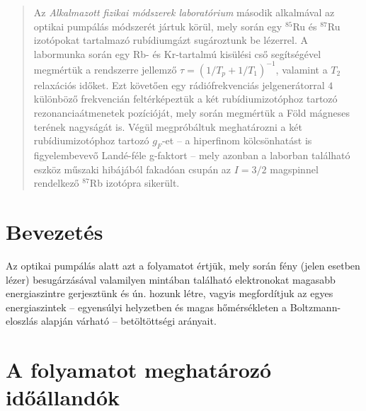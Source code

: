 \begin{abstract}
    \noindent Az \emph{Alkalmazott fizikai módszerek laboratórium} második alkalmával az optikai pumpálás módszerét jártuk körül, mely során egy $^{85}$Ru és $^{87}$Ru izotópokat tartalmazó rubídiumgázt sugároztunk be lézerrel. A labormunka során egy Rb- és Kr-tartalmú kisülési cső segítségével megmértük a rendszerre jellemző $\tau = \left( 1/T_{p} + 1/T_{1} \right)^{-1}$, valamint a $T_{2}$ relaxációs időket. Ezt követően egy rádiófrekvenciás jelgenerátorral $4$ különböző frekvencián feltérképeztük a két rubídiumizotóphoz tartozó rezonanciaátmenetek pozícióját, mely során megmértük a Föld mágneses terének nagyságát is. Végül megpróbáltuk meghatározni a két rubídiumizotóphoz tartozó $g_{F}$-et -- a hiperfinom kölcsönhatást is figyelembevevő Landé-féle g-faktort -- mely azonban a laborban található eszköz műszaki hibájából fakadóan csupán az $I=3/2$ magspinnel rendelkező $^{87}$Rb izotópra sikerült.
\end{abstract}

\begin{multicols}{2}
\section{Bevezetés}
Az optikai pumpálás alatt azt a folyamatot értjük, mely során fény (jelen esetben lézer) besugárzásával valamilyen mintában található elektronokat magasabb energiaszintre gerjesztünk és ún.  hozunk létre, vagyis megfordítjuk az egyes energiaszintek -- egyensúlyi helyzetben és magas hőmérsékleten a Boltzmann-eloszlás alapján várható -- betöltöttségi arányait.

\section{A folyamatot meghatározó időállandók}


\end{multicols}